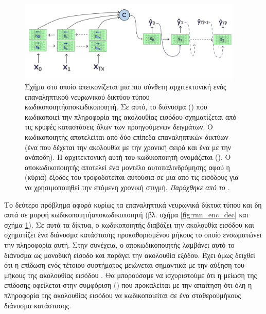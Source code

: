 \begin{figure}[h]
  \centering
  \includegraphics[width=0.95\textwidth]{images/chapter theoritical background/rnn_encoder_decoder_complex.pdf}
  \caption{Σχήμα στο οποίο απεικονίζεται μια πιο σύνθετη αρχιτεκτονική ενός επαναληπτικού νευρωνικού δικτύου τύπου κωδικοποιητή\textendash αποκωδικοποιητή. Σε αυτό, το διάνυσμα () που κωδικοποιεί την πληροφορία της ακολουθίας εισόδου σχηματίζεται από τις κρυφές καταστάσεις όλων των προηγούμενων δειγμάτων. Ο κωδικοποιητής αποτελείται από δύο επίπεδα επαναληπτικών δικτύων (ένα που δέχεται την ακολουθία με την χρονική σειρά και ένα με την ανάποδη). Η αρχιτεκτονική αυτή του κωδικοποιητή ονομάζεται  (). Ο αποκωδικοποιητής αποτελεί ένα μοντέλο αυτοπαλινδρόμησης αφού η (κύρια) έξοδός του τροφοδοτείται αυτούσια σε μια από τις εισόδους για να χρησιμοποιηθεί την επόμενη χρονική στιγμή. \textit{Παράχθηκε από το \href{https://inkscape.org/}{}}.}
  \label{fig:rnn_encoder_decoder_no_attention}
\end{figure}

Το δεύτερο πρόβλημα αφορά κυρίως τα επαναληπτικά νευρωνικά δίκτυα τύπου  και δη αυτά σε μορφή κωδικοποιητή\textendash αποκωδικοποιητή (βλ. σχήμα \ref{fig:rnn_enc_dec} και σχήμα \ref{fig:rnn_encoder_decoder_no_attention}). Σε αυτά τα δίκτυα, ο κωδικοποιητής διαβάζει την ακολουθία εισόδου και σχηματίζει ένα διάνυσμα κατάστασης προκαθορισμένου μήκους το οποίο ενσωματώνει την πληροφορία αυτή. Στην συνέχεια, ο αποκωδικοποιητής λαμβάνει αυτό το διάνυσμα ως μοναδική είσοδο και παράγει την ακολουθία εξόδου. Έχει όμως δειχθεί ότι η επίδωση ενός τέτοιου συστήματος μειώνεται σημαντικά με την αύξηση του μήκους της ακολουθίας εισόδου \cite{cho2014properties}. Θα μπορούσαμε να ισχυριστούμε ότι η μείωση της επίδοσης οφείλεται στην συμφόριση () που προκαλείται με την απαίτηση ότι όλη η πληροφορία της ακολουθίας εισόδου να κωδικοποιείται σε ένα σταθερού\textendash μήκους διάνυσμα κατάστασης\cite{bahdanau2014neural_machine_translation_attention_begins}.\par

